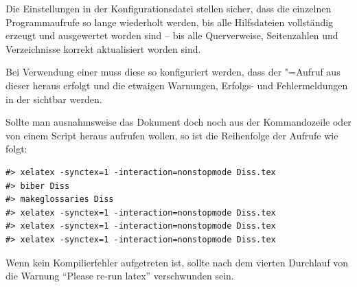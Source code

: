 Die Einstellungen in der Konfigurationsdatei  stellen sicher, dass die einzelnen Programmaufrufe so lange wiederholt werden, 
bis alle Hilfsdateien vollständig erzeugt und ausgewertet worden sind -- bis alle Querverweise, Seitenzahlen und Verzeichnisse korrekt aktualisiert worden sind.

Bei Verwendung einer  muss
diese so konfiguriert werden, dass der "=Aufruf aus dieser heraus erfolgt und
die etwaigen Warnungen, Erfolgs- und Fehlermeldungen in der  sichtbar werden.

Sollte man ausnahmsweise das Dokument doch noch aus der Kommandozeile oder von einem Script heraus aufrufen wollen,
so ist die Reihenfolge der Aufrufe wie folgt:
\begin{verbatim}
#> xelatex -synctex=1 -interaction=nonstopmode Diss.tex
#> biber Diss
#> makeglossaries Diss
#> xelatex -synctex=1 -interaction=nonstopmode Diss.tex
#> xelatex -synctex=1 -interaction=nonstopmode Diss.tex
#> xelatex -synctex=1 -interaction=nonstopmode Diss.tex
\end{verbatim}

Wenn kein Kompilierfehler aufgetreten ist,
sollte nach dem vierten Durchlauf von  die
Warnung \enquote{Please re-run latex}
verschwunden sein.